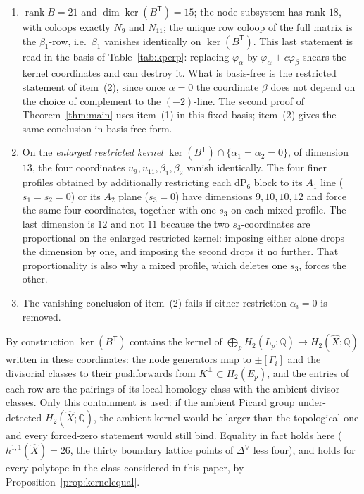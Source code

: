 \documentclass[11pt]{amsart}
\theoremstyle{definition}
\theoremstyle{remark}
\theoremstyle{plain}
\newcommand{\QQ}{\mathbb{Q}}
\newcommand{\rk}{\operatorname{rank}}
\newcommand{\dP}{\mathrm{dP}}
\newcommand{\Xh}{\widehat{X}}
\begin{document}
\begin{enumerate}
\item $\rk B=21$ and $\dim\ker(B^{\mathsf T})=15$; the node
subsystem has rank $18$, with coloops exactly $N_9$ and $N_{11}$; the
unique row coloop of the full matrix is the $\beta_1$-row, i.e.\
$\beta_1$ vanishes identically on $\ker(B^{\mathsf T})$.  This last
statement is read in the basis of Table~\ref{tab:kperp}: replacing
$\varphi_\alpha$ by $\varphi_\alpha+c\varphi_\beta$ shears the kernel
coordinates and can destroy it.  What is basis-free is the restricted
statement of item~(2), since once $\alpha=0$ the coordinate $\beta$ does
not depend on the choice of complement to the $(-2)$-line.  The second
proof of Theorem~\ref{thm:main} uses item~(1) in this fixed basis;
item~(2) gives the same conclusion in basis-free form.
\item On the \emph{enlarged restricted kernel}
$\ker(B^{\mathsf T})\cap\{\alpha_1=\alpha_2=0\}$, of dimension $13$,
the four coordinates $u_9,u_{11},\beta_1,\beta_2$ vanish identically.
The four finer profiles obtained by additionally restricting each
$\dP_6$ block to its $A_1$ line ($s_1=s_2=0$) or its $A_2$ plane
($s_3=0$) have dimensions $9,10,10,12$ and force the same four
coordinates, together with one $s_3$ on each mixed profile.  The last dimension
is $12$ and not $11$ because the two $s_3$-coordinates are proportional on the
enlarged restricted kernel: imposing either alone drops the dimension by one,
and imposing the second drops it no further.  That proportionality is also why
a mixed profile, which deletes one $s_3$, forces the other.
\item The vanishing conclusion of item~(2) fails if either restriction
$\alpha_i=0$ is removed.
\end{enumerate}
By construction $\ker(B^{\mathsf T})$ contains the kernel of
$\bigoplus_pH_2(L_p;\QQ)\to H_2(\Xh;\QQ)$ written in these
coordinates: the node generators map to $\pm[\Gamma_i]$ and the
divisorial classes to their pushforwards from
$K^{\perp}\subset H_2(E_p)$, and the entries of each row are the pairings
of its local homology class with the ambient divisor classes.
Only this containment is used: if the ambient
Picard group under-detected $H_2(\Xh;\QQ)$, the ambient kernel
would be larger than the topological one and every forced-zero
statement would still bind.  Equality in fact holds here
($h^{1,1}(\Xh)=26$, the thirty boundary lattice points of $\Delta^{\vee}$ less
four),
and holds for every
polytope in the class considered in this paper, by
Proposition~\ref{prop:kernelequal}.
\end{document}

